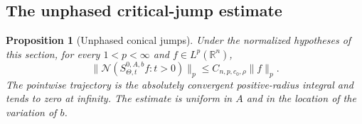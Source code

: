 \documentclass[11pt]{article}
\numberwithin{equation}{section}
\newtheorem{proposition}[theorem]{Proposition}
\theoremstyle{remark}
\theoremstyle{definition}
\newcommand{\NN}{\mathcal N}
\begin{document}
\subsection{The unphased critical-jump estimate}

\begin{proposition}[Unphased conical jumps]\label{mod:unphased}
Under the normalized hypotheses of this section, for every
$1<p<\infty$ and $f\in L^p(\mathbb R^n)$,
\begin{equation}\label{mod:unphased-bound}
 \|\NN(S^{0,A,b}_{\Theta,t}f:t>0)\|_p
 \le C_{n,p,c_0,\rho}\|f\|_p.
\end{equation}
The pointwise trajectory is the absolutely convergent positive-radius
integral and tends to zero at infinity. The estimate is uniform in
$A$ and in the location of the variation of $b$.
\end{proposition}
\end{document}
